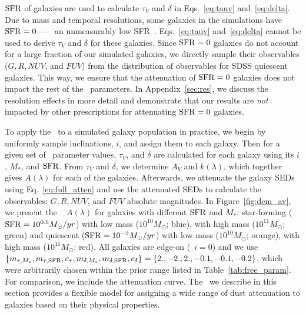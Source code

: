 
${\rm SFR}$ of galaxies are used to calculate $\tau_V$ and $\delta$ in
Eqs.~\ref{eq:tauv} and~\ref{eq:delta}. Due to mass and temporal resolutions,
some galaxies in the simulations have ${\rm SFR}=0$ --- \ie~an unmeasurably low
SFR~\citep{hahn2019c}. Eqs.~\ref{eq:tauv} and~\ref{eq:delta} cannot be used to
derive $\tau_V$ and $\delta$ for these galaxies. Since ${\rm SFR}=0$ galaxies do
not account for a large fraction of our simulated galaxies, we directly sample 
their observables ($G, R, NUV$, and $FUV$) from the distribution of observables
for SDSS quiescent galaxies. This way, we ensure that the attenuation of ${\rm SFR}=0$ 
galaxies does not impact the rest of the \eda~parameters. In Appendix~\ref{sec:res}, 
we discuss the resolution effects in more detail and demonstrate that our results
are \emph{not} impacted by other prescriptions for attenuating ${\rm SFR}=0$ galaxies.

To apply the \eda~to a simulated galaxy population in practice, we begin by
uniformly sample inclinations, $i$, and assign them to each galaxy. Then for a
given set of \eda~parameter values, $\tau_V$, and $\delta$ are calculated for
each galaxy using its $i$, $M_*$, and ${\rm SFR}$. From $\tau_V$ and $\delta$, we
determine $A_V$ and $k(\lambda)$, which together gives $A(\lambda)$ for each of
the galaxies.  Afterwards, we attenuate the galaxy SEDs using Eq.~\ref{eq:full_atten} and use 
the attenuated SEDs to calculate the observables: $G, R, NUV$, and $FUV$
absolute magnitudes. In Figure~\ref{fig:dem_av}, we present the \eda~ 
$A(\lambda)$
for galaxies with different ${\rm SFR}$ and $M_*$: 
star-forming (${\rm SFR}=10^{0.5}M_\odot/yr$) with low mass ($10^{10}M_\odot$;
blue), with high mass ($10^{11}M_\odot$; green) and quiescent
(${\rm SFR}=10^{-2}M_\odot/yr$) with low mass ($10^{10}M_\odot$; orange), with high
mass ($10^{11}M_\odot$; red). All galaxies are edge-on (\ie~$i=0$) and we use
$\{m_{\tau,M_*}, m_{\tau,{\rm SFR}}, c_\tau, m_{\delta,M_*}, m_{\delta,{\rm SFR}},
c_\delta\} = \{2., -2., 2., -0.1, -0.1, -0.2\}$, which were arbitrarily chosen
within the prior range listed in Table~\ref{tab:free_param}. For comparison, we 
include the \cite{calzetti2001} attenuation curve. The \eda~we describe in this 
section provides a flexible model for assigning a wide range of dust attenuation 
to galaxies based on their physical properties. 

